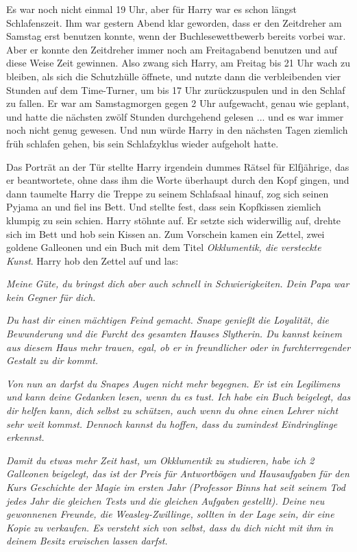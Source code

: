 Es war noch nicht einmal 19 Uhr, aber für Harry war es schon längst
Schlafenszeit. Ihm war gestern Abend klar geworden, dass er den Zeitdreher am
Samstag erst benutzen konnte, wenn der Buchlesewettbewerb bereits vorbei war.
Aber er konnte den Zeitdreher immer noch am Freitagabend benutzen und auf diese
Weise Zeit gewinnen. Also zwang sich Harry, am Freitag bis 21 Uhr wach zu
bleiben, als sich die Schutzhülle öffnete, und nutzte dann die verbleibenden
vier Stunden auf dem Time-Turner, um bis 17 Uhr zurückzuspulen und in den Schlaf
zu fallen. Er war am Samstagmorgen gegen 2 Uhr aufgewacht, genau wie geplant,
und hatte die nächsten zwölf Stunden durchgehend gelesen ... und es war immer
noch nicht genug gewesen. Und nun würde Harry in den nächsten Tagen ziemlich
früh schlafen gehen, bis sein Schlafzyklus wieder aufgeholt hatte.

Das Porträt an der Tür stellte Harry irgendein dummes Rätsel für Elfjährige, das
er beantwortete, ohne dass ihm die Worte überhaupt durch den Kopf gingen, und
dann taumelte Harry die Treppe zu seinem Schlafsaal hinauf, zog sich seinen
Pyjama an und fiel ins Bett. Und stellte fest, dass sein Kopfkissen ziemlich
klumpig zu sein schien. Harry stöhnte auf. Er setzte sich widerwillig auf,
drehte sich im Bett und hob sein Kissen an. Zum Vorschein kamen ein Zettel, zwei
goldene Galleonen und ein Buch mit dem Titel \emph{Okklumentik, die versteckte
Kunst}. Harry hob den Zettel auf und las:

\emph{Meine Güte, du bringst dich aber auch schnell in Schwierigkeiten. Dein
Papa war kein Gegner für dich.}

\emph{Du hast dir einen mächtigen Feind gemacht. Snape genießt die Loyalität,
die Bewunderung und die Furcht des gesamten Hauses Slytherin. Du kannst keinem
aus diesem Haus mehr trauen, egal, ob er in freundlicher oder in
furchterregender Gestalt zu dir kommt.}

\emph{Von nun an darfst du Snapes Augen nicht mehr begegnen. Er ist ein
Legilimens und kann deine Gedanken lesen, wenn du es tust. Ich habe ein Buch
beigelegt, das dir helfen kann, dich selbst zu schützen, auch wenn du ohne einen
Lehrer nicht sehr weit kommst. Dennoch kannst du hoffen, dass du zumindest
Eindringlinge erkennst.}

\emph{Damit du etwas mehr Zeit hast, um Okklumentik zu studieren, habe ich 2
Galleonen beigelegt, das ist der Preis für Antwortbögen und Hausaufgaben für den
Kurs Geschichte der Magie im ersten Jahr (Professor Binns hat seit seinem Tod
jedes Jahr die gleichen Tests und die gleichen Aufgaben gestellt). Deine neu
gewonnenen Freunde, die Weasley-Zwillinge, sollten in der Lage sein, dir eine
Kopie zu verkaufen. Es versteht sich von selbst, dass du dich nicht mit ihm in
deinem Besitz erwischen lassen darfst.}


